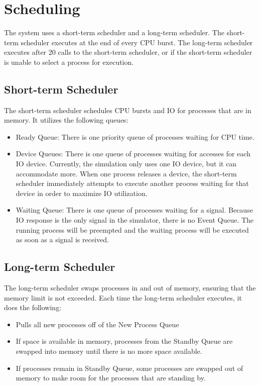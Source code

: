 \documentclass[paper=a4, fontsize=11pt]{scrartcl} %
\numberwithin{equation}{section} %
\numberwithin{figure}{section} %
\numberwithin{table}{section} %
\begin{document}
\section{Scheduling}

The system uses a short-term scheduler and a long-term scheduler. The short-term scheduler executes at the end of every CPU burst. The long-term scheduler executes after 20 calls to the short-term scheduler, or if the short-term scheduler is unable to select a process for execution.

\subsection{Short-term Scheduler}

The short-term scheduler schedules CPU bursts and IO for processes that are in memory. It utilizes the following queues:
\begin{itemize}
	\item Ready Queue: There is one priority queue of processes waiting for CPU time.
           \item Device Queues: There is one queue of processes waiting for accesses for each IO device. 
Currently, the simulation only uses one IO device, but it can accommodate more. When one process releases
a device, the short-term scheduler immediately attempts to execute another process waiting for that device in order to
maximize IO utilization.
	\item Waiting Queue: There is one queue of processes waiting for a signal. Because IO response is the only signal in the
simulator, there is no Event Queue. The running process will be preempted and the waiting process will be executed as soon as a signal is received.

\end{itemize}

\subsection{Long-term Scheduler}

The long-term scheduler swaps processes in and out of memory, ensuring that the memory limit is not exceeded. Each time the long-term scheduler executes, it does the following:
\begin{itemize}
	\item Pulls all new processes off of the New Process Queue
           \item If space is available in memory, processes from the Standby Queue are swapped into memory until there is no more space available.
	\item If processes remain in Standby Queue, some processes are swapped out of memory to make room for the processes that are standing by.

\end{itemize}
\end{document}
